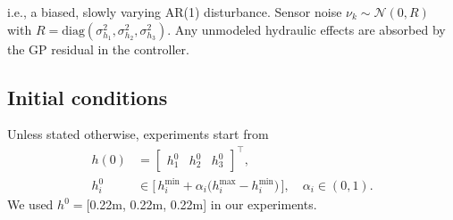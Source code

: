 \documentclass[10pt]{article}
\newcommand{\1}{\mathbbm{1}}
\begin{document}
i.e., a biased, slowly varying AR(1) disturbance. Sensor noise \(\nu_k\sim\mathcal N(0,R)\) with \(R=\mathrm{diag}(\sigma_{h_1}^2,\sigma_{h_2}^2,\sigma_{h_3}^2)\). Any unmodeled hydraulic effects are absorbed by the GP residual in the controller.

\subsection{Initial conditions}\label{subsec:initial}
Unless stated otherwise, experiments start from
\begin{equation}
\begin{aligned}
h(0) &= \begin{bmatrix} h_1^0 & h_2^0 & h_3^0 \end{bmatrix}^\top,\\
h_i^0 &\in \big[\, h_i^{\min} + \alpha_i \big(h_i^{\max}-h_i^{\min}\big) \,\big],\quad
\alpha_i \in (0,1).
\end{aligned}
\label{eq:init_levels}
\end{equation}
%
We used \(h^0=\)[{0.22}{m}, {0.22}{m}, {0.22}{m}] in our experiments.

\begin{table}[t]
\centering
\caption{Three-tank plant parameters (symbols, meaning, units, values).}
\label{tab:plant_params}
\end{table}
\end{document}
